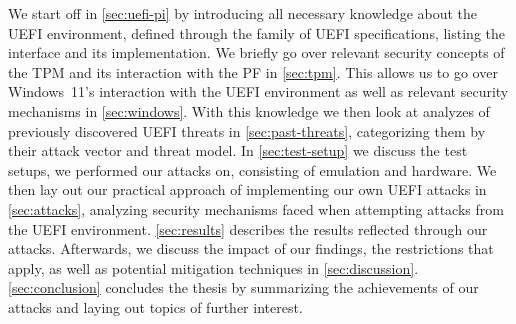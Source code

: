 We start off in \autoref{sec:uefi-pi} by introducing all necessary knowledge about the \ac{UEFI} environment, defined through the family of \ac{UEFI} specifications, listing the interface and its implementation.
We briefly go over relevant security concepts of the \ac{TPM} and its interaction with the \ac{PF} in \autoref{sec:tpm}.
This allows us to go over Windows~11's interaction with the \ac{UEFI} environment as well as relevant security mechanisms in \autoref{sec:windows}.
With this knowledge we then look at analyzes of previously discovered \ac{UEFI} threats in \autoref{sec:past-threats}, categorizing them by their attack vector and threat model.
In \autoref{sec:test-setup} we discuss the test setups, we performed our attacks on, consisting of emulation and hardware.
We then lay out our practical approach of implementing our own \ac{UEFI} attacks in \autoref{sec:attacks}, analyzing security mechanisms faced when attempting attacks from the \ac{UEFI} environment.
\autoref{sec:results} describes the results reflected through our attacks.
Afterwards, we discuss the impact of our findings, the restrictions that apply, as well as potential mitigation techniques in \autoref{sec:discussion}.
\autoref{sec:conclusion} concludes the thesis by summarizing the achievements of our attacks and laying out topics of further interest.